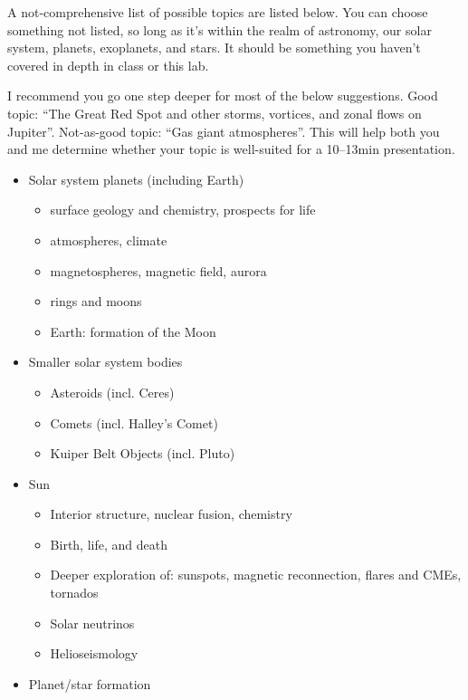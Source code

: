 \documentclass[11pt]{article}%
\begin{document}
A not-comprehensive list of possible topics are listed below. You can choose something
not listed, so long as it's within the realm of astronomy, our solar system, planets,
exoplanets, and stars.  It should be something you haven't covered in depth in
class or this lab.

I recommend you go one step deeper for most of the below suggestions.
Good topic: ``The Great Red Spot and other storms, vortices, and zonal flows on
Jupiter''.
Not-as-good topic: ``Gas giant atmospheres''.
This will help both you and me determine whether your topic is well-suited for
a 10--13min presentation.

\begin{itemize}[noitemsep]
    \item Solar system planets (including Earth)
        \begin{itemize}[noitemsep]
            \item surface geology and chemistry, prospects for life
            \item atmospheres, climate
            \item magnetospheres, magnetic field, aurora
            \item rings and moons
            \item Earth: formation of the Moon
        \end{itemize}
    \item Smaller solar system bodies
        \begin{itemize}[noitemsep]
            \item Asteroids (incl. Ceres)
            \item Comets (incl. Halley’s Comet)
            \item Kuiper Belt Objects (incl. Pluto)
        \end{itemize}
    \item Sun
        \begin{itemize}[noitemsep]
            \item Interior structure, nuclear fusion, chemistry
            \item Birth, life, and death
            \item Deeper exploration of: sunspots, magnetic reconnection,
                flares and CMEs, tornados
            \item Solar neutrinos
            \item Helioseismology
        \end{itemize}
    \item Planet/star formation

\end{itemize}
\end{document}
